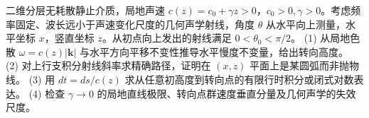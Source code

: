 二维分层无耗散静止介质，局地声速 \(c(z)=c_0+\gamma z>0\)，\(c_0>0,\gamma>0\)。考虑频率固定、波长远小于声速变化尺度的几何声学射线，角度 \(\theta\) 从水平向上测量，水平坐标 \(x\)，竖直坐标 \(z\)。从初点向上发出的射线满足 \(0<\theta_0<\pi/2\)。
(1) 从局地色散 \(\omega=c(z)|\boldsymbol k|\) 与水平方向平移不变性推导水平慢度不变量，给出转向高度。
(2) 对上行支积分射线斜率求精确路径，证明在 \((x,z)\) 平面上是某圆弧而非抛物线。
(3) 用 \(dt=ds/c(z)\) 求从任意初高度到转向点的有限行时积分或闭式对数表达。
(4) 检查 \(\gamma\to0\) 的局地直线极限、转向点群速度垂直分量及几何声学的失效尺度。
